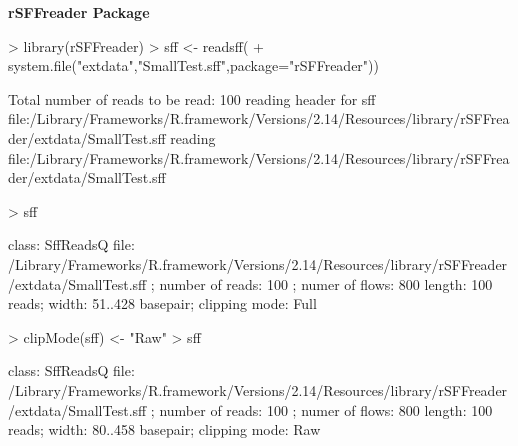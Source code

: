 \documentclass[pdf]{beamer}
\begin{document}
\begin{frame}[fragile]
\textbf{rSFFreader Package}
\begin{block}{}
\begin{footnotesize}
\begin{Schunk}
\begin{Sinput}
> library(rSFFreader)
> sff <- readsff(
+  system.file("extdata","SmallTest.sff",package="rSFFreader"))
\end{Sinput}
\begin{Soutput}
Total number of reads to be read: 100
reading header for sff file:/Library/Frameworks/R.framework/Versions/2.14/Resources/library/rSFFreader/extdata/SmallTest.sff
reading file:/Library/Frameworks/R.framework/Versions/2.14/Resources/library/rSFFreader/extdata/SmallTest.sff
\end{Soutput}
\begin{Sinput}
> sff
\end{Sinput}
\begin{Soutput}
class: SffReadsQ
file: /Library/Frameworks/R.framework/Versions/2.14/Resources/library/rSFFreader/extdata/SmallTest.sff ; number of reads: 100 ; numer of flows: 800 
length: 100 reads; width: 51..428 basepair; clipping mode: Full 
\end{Soutput}
\begin{Sinput}
> clipMode(sff) <- "Raw"
> sff
\end{Sinput}
\begin{Soutput}
class: SffReadsQ
file: /Library/Frameworks/R.framework/Versions/2.14/Resources/library/rSFFreader/extdata/SmallTest.sff ; number of reads: 100 ; numer of flows: 800 
length: 100 reads; width: 80..458 basepair; clipping mode: Raw 
\end{Soutput}
\end{Schunk}
\end{footnotesize}
\end{block}
\end{frame}
\end{document}

